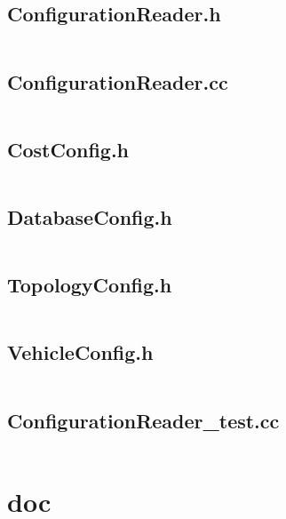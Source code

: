 \documentclass[../main.tex]{subfiles}
\begin{document}
\subsection{ConfigurationReader.h}\label{lst:config-configuration-reader-h}
\inputminted[linenos=true]{cpp}{parts/code/config/ConfigurationReader.h}

\subsection{ConfigurationReader.cc}\label{lst:config-configuration-reader-cc}
\inputminted[linenos=true]{cpp}{parts/code/config/ConfigurationReader.cc}

\subsection{CostConfig.h}\label{lst:config-cost-config-h}
\inputminted[linenos=true]{cpp}{parts/code/config/CostConfig.h}

\subsection{DatabaseConfig.h}\label{lst:config-database-config-h}
\inputminted[linenos=true]{cpp}{parts/code/config/DatabaseConfig.h}

\subsection{TopologyConfig.h}\label{lst:config-topology-config-h}
\inputminted[linenos=true]{cpp}{parts/code/config/TopologyConfig.h}

\subsection{VehicleConfig.h}\label{lst:config-vehicle-config-h}
\inputminted[linenos=true]{cpp}{parts/code/config/VehicleConfig.h}

\subsection{ConfigurationReader\_test.cc}\label{lst:config-configuration-reader-test-cc}
\inputminted[linenos=true]{cpp}{parts/code/config/catchtest/ConfigurationReader_test.cc}

\section{doc}
\end{document}
